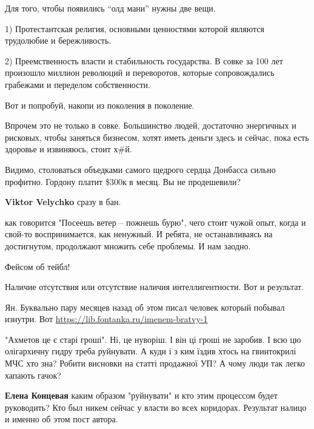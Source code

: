 \begin{itemize}

Для того, чтобы появились \enquote{олд мани} нужны две вещи.

1) Протестантская религия, основными ценностями которой являются трудолюбие и бережливость.

2) Преемственность власти и стабильность государства. В совке за 100 лет
произошло миллион революций и переворотов, которые сопровождались грабежами и
переделом собственности.

Вот и попробуй, накопи из поколения в поколение.

Впрочем это не только в совке. Большинство людей, достаточно энергичных и
рисковых, чтобы заняться бизнесом, хотят иметь деньги здесь и сейчас, пока есть
здоровье и извиняюсь, стоит х\#й.



Видимо, столоваться объедками самого щедрого сердца Донбасса сильно профитно.
Гордону платит \$300к в месяц. Вы не продешевили?

\begin{itemize} %
\textbf{Viktor Velychko} сразу в бан.
\end{itemize} %


как говорится "Посеешь ветер – пожнешь бурю", чего стоит чужой опыт, когда и
свой-то воспринимается, как ненужный. И ребята, не останавливаясь на
достигнутом, продолжают множить себе проблемы. И нам заодно.

Фейсом об тейбл!

Наличие отсутствия или отсутствие наличия интеллигентности. Вот и результат.


Ян. Буквально пару месяцев назад об этом писал человек который побывал изнутри.
Вот \url{https://lib.fontanka.ru/imenem-bratvy-1}


"Ахметов це є старі гроші". Ні, це нуворіш. І він ці гроші не заробив. І всю цю
олігархичну гидру треба руйнувати. А куди і з ким їздив хтось на гвинтокрилі
МЧС хто зна? Робити висновки на статті продажної УП? А чому люди так легко
хапають гачок?

\begin{itemize} %
\textbf{Елена Концевая} каким образом "руйнувати" и кто этим процессом будет руководить? Кто был никем сейчас у власти во всех коридорах. Результат налицо и именно об этом пост автора.


\end{itemize}
\end{itemize}
